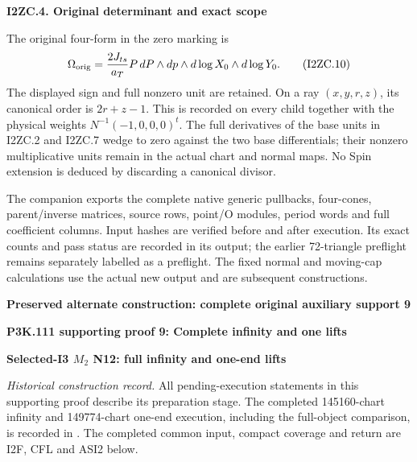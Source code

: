 \par

\medskip\noindent\textbf{I2ZC.4. Original determinant and exact scope}

\par\nobreak

The original four-form in the zero marking is
\[
 \Omega_{\rm orig}=
 \frac{2J_{ts}}{a_T}P\,dP\wedge dp\wedge
 d\log X_0\wedge d\log Y_0.
 \tag{I2ZC.10}
\]
The displayed sign and full nonzero unit are retained. On a ray
\((x,y,r,z)\), its canonical order is \(2r+z-1\). This is
recorded on every child together with the physical weights
\(N^{-1}(-1,0,0,0)^t\). The full derivatives of the base units
in I2ZC.2 and I2ZC.7 wedge to zero against the two base
differentials; their nonzero multiplicative units remain in the
actual chart and normal maps. No Spin extension is deduced by
discarding a canonical divisor.

The companion exports the complete native generic pullbacks,
four-cones, parent/inverse matrices, source rows, point/O modules,
period words and full coefficient columns. Input hashes are
verified before and after execution. Its exact counts and pass
status are recorded in its output; the earlier 72-triangle
preflight remains separately labelled as a preflight. The fixed
normal and moving-cap calculations use the actual new output and
are subsequent constructions.






\par\bigskip\noindent\textbf{Preserved alternate construction: complete original auxiliary support 9}\par
\par\bigskip\noindent\textbf{P3K.111 supporting proof 9: Complete infinity and one lifts}\par\nobreak
\par

\medskip\noindent\textbf{Selected-I3 \(M_{2}\) N12: full infinity and one-end lifts}

\par\nobreak

\emph{Historical construction record.} All pending-execution statements in this supporting proof describe its preparation stage. The completed 145160-chart infinity and 149774-chart one-end execution, including the full-object comparison, is recorded in . The completed common input, compact coverage and return are I2F, CFL and ASI2 below.

